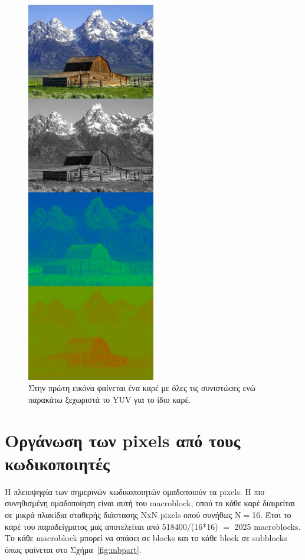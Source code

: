 \begin{figure}[p]

    \centering
        \includegraphics[totalheight=0.9\textheight,width=0.5\textwidth]{chapter2/yuv.jpg}
    \caption{Στην πρώτη εικόνα φαίνεται ένα καρέ με όλες τις συνιστώσες ενώ παρακάτω ξεχωριστά το YUV για το ίδιο καρέ.}
    \label{fig:yuv}
\end{figure}

\newpage
\section{Οργάνωση των pixels από τους κωδικοποιητές}
\label{section:sect23}

\indent Η πλειοψηφία των σημερινών κωδικοποιητών ομαδοποιούν τα pixels. Η πιο συνηθισμένη ομαδοποίηση είναι αυτή του macroblock, οπού το κάθε καρέ διαιρείται σε μικρά πλακίδια σταθερής διάστασης NxN pixels οπού συνήθως N$=$16. Έτσι το καρέ του παραδείγματος μας αποτελείται από 518400/(16*16) $=$ 2025 macroblocks. Το κάθε macroblock μπορεί να σπάσει σε blocks και το κάθε block σε subblocks όπως φαίνεται στο Σχήμα~\ref{fig:mbpart}.

